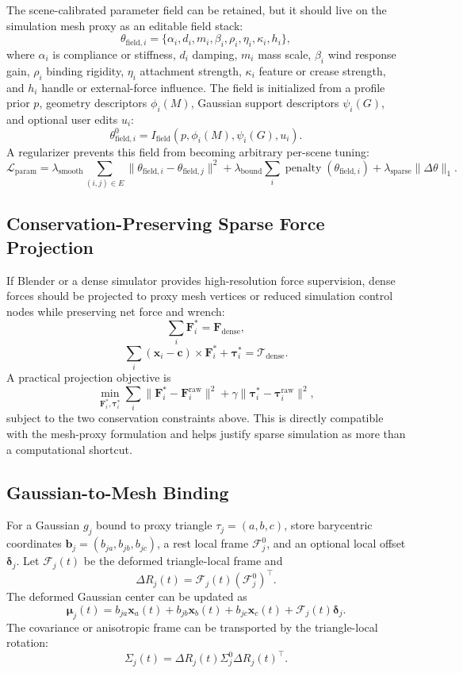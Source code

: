 \documentclass[11pt]{article}
\begin{document}
The scene-calibrated parameter field can be retained, but it should live on the simulation mesh proxy as an editable field stack:
\[
  \theta_{\mathrm{field},i}
  =
  \{\alpha_i,d_i,m_i,\beta_i,\rho_i,\eta_i,\kappa_i,h_i\},
\]
where \(\alpha_i\) is compliance or stiffness, \(d_i\) damping, \(m_i\) mass scale, \(\beta_i\) wind response gain, \(\rho_i\) binding rigidity, \(\eta_i\) attachment strength, \(\kappa_i\) feature or crease strength, and \(h_i\) handle or external-force influence. The field is initialized from a profile prior \(p\), geometry descriptors \(\phi_i(M)\), Gaussian support descriptors \(\psi_i(G)\), and optional user edits \(u_i\):
\[
  \theta_{\mathrm{field},i}^{0}
  =
  I_{\mathrm{field}}\left(p,\phi_i(M),\psi_i(G),u_i\right).
\]
A regularizer prevents this field from becoming arbitrary per-scene tuning:
\[
  \mathcal{L}_{\mathrm{param}}
  =
  \lambda_{\mathrm{smooth}}
  \sum_{(i,j)\in E}
  \|\theta_{\mathrm{field},i}-\theta_{\mathrm{field},j}\|^2
  +
  \lambda_{\mathrm{bound}}
  \sum_i \operatorname{penalty}(\theta_{\mathrm{field},i})
  +
  \lambda_{\mathrm{sparse}}
  \|\Delta\theta\|_1.
\]

\subsection{Conservation-Preserving Sparse Force Projection}

If Blender or a dense simulator provides high-resolution force supervision, dense forces should be projected to proxy mesh vertices or reduced simulation control nodes while preserving net force and wrench:
\[
  \sum_i \mathbf{F}_i^\ast = \mathbf{F}_{\mathrm{dense}},
\]
\[
  \sum_i
  (\mathbf{x}_i-\mathbf{c})\times \mathbf{F}_i^\ast
  +
  \boldsymbol{\tau}_i^\ast
  =
  \boldsymbol{\mathcal{T}}_{\mathrm{dense}}.
\]
A practical projection objective is
\[
  \min_{\mathbf{F}_i^\ast,\boldsymbol{\tau}_i^\ast}
  \sum_i
  \|\mathbf{F}_i^\ast-\mathbf{F}_i^{\mathrm{raw}}\|^2
  +
  \gamma
  \|\boldsymbol{\tau}_i^\ast-\boldsymbol{\tau}_i^{\mathrm{raw}}\|^2,
\]
subject to the two conservation constraints above. This is directly compatible with the mesh-proxy formulation and helps justify sparse simulation as more than a computational shortcut.

\subsection{Gaussian-to-Mesh Binding}

For a Gaussian \(g_j\) bound to proxy triangle \(\tau_j=(a,b,c)\), store barycentric coordinates \(\mathbf{b}_j=(b_{ja},b_{jb},b_{jc})\), a rest local frame \(\mathcal{F}_j^0\), and an optional local offset \(\boldsymbol{\delta}_j\). Let \(\mathcal{F}_j(t)\) be the deformed triangle-local frame and
\[
  \Delta R_j(t)=\mathcal{F}_j(t)(\mathcal{F}_j^0)^\top .
\]
The deformed Gaussian center can be updated as
\[
  \boldsymbol{\mu}_j(t)
  =
  b_{ja}\mathbf{x}_a(t)
  +
  b_{jb}\mathbf{x}_b(t)
  +
  b_{jc}\mathbf{x}_c(t)
  +
  \mathcal{F}_j(t)\boldsymbol{\delta}_j.
\]
The covariance or anisotropic frame can be transported by the triangle-local rotation:
\[
  \Sigma_j(t)
  =
  \Delta R_j(t)\Sigma_j^0 \Delta R_j(t)^\top.
\]
\end{document}
